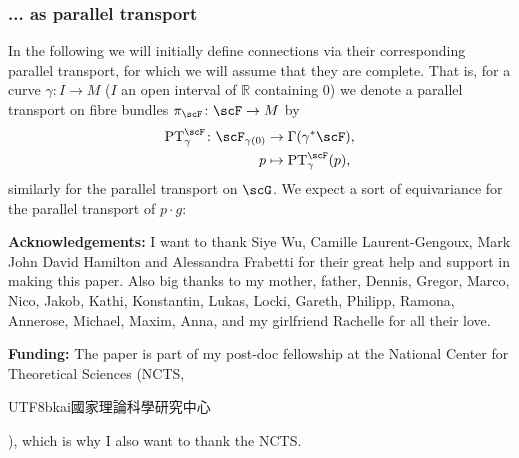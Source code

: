 \documentclass[reqno,a4paper,oneside]{amsart}
\theoremstyle{plain}
\theoremstyle{remark}
\theoremstyle{definition}
\begin{document}
\subsubsection{... as parallel transport}

In the following we will initially define connections via their corresponding parallel transport, for which we will assume that they are complete. That is, for a curve $\gamma \colon I \to M$ ($I$ an open interval of $\mathbb{R}$ containing $0$) we denote a parallel transport on fibre bundles $\pi_\scF \colon \scF \to M$ by 
    \begin{align*}
    \mathrm{PT}^\scF_\gamma \colon \scF_{\gamma(0)} &\to \Gamma\mleft( \gamma^*\scF \mright),
    \\
    p &\mapsto \mathrm{PT}^\scF_\gamma(p),
    \end{align*}
    similarly for the parallel transport on $\scG$. We expect a sort of equivariance for the parallel transport of $p \cdot g$:

\textbf{Acknowledgements:} I want to thank Siye Wu, Camille Laurent-Gengoux, Mark John David Hamilton and Alessandra Frabetti for their great help and support in making this paper. Also big thanks to my mother, father, Dennis, Gregor, Marco, Nico, Jakob, Kathi, Konstantin, Lukas, Locki, Gareth, Philipp, Ramona, Annerose, Michael, Maxim, Anna, and my girlfriend Rachelle for all their love.

\textbf{Funding:} The paper is part of my post-doc fellowship at the National Center for Theoretical Sciences (NCTS, \begin{CJK*}{UTF8}{bkai}國家理論科學研究中心\end{CJK*}), which is why I also want to thank the NCTS.





\appendix
\setcounter{equation}{0}
\renewcommand{\theequation}{\Alph{section}.\arabic{equation}} %

\renewcommand\refname{List of References}





\end{document}
